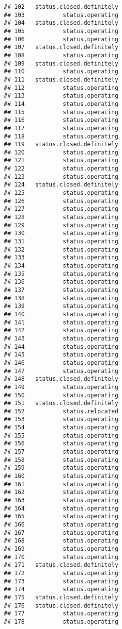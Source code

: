 \documentclass[
]{article}
\begin{document}
\begin{verbatim}
## 102   status.closed.definitely
## 103           status.operating
## 104   status.closed.definitely
## 105           status.operating
## 106           status.operating
## 107   status.closed.definitely
## 108           status.operating
## 109   status.closed.definitely
## 110           status.operating
## 111   status.closed.definitely
## 112           status.operating
## 113           status.operating
## 114           status.operating
## 115           status.operating
## 116           status.operating
## 117           status.operating
## 118           status.operating
## 119   status.closed.definitely
## 120           status.operating
## 121           status.operating
## 122           status.operating
## 123           status.operating
## 124   status.closed.definitely
## 125           status.operating
## 126           status.operating
## 127           status.operating
## 128           status.operating
## 129           status.operating
## 130           status.operating
## 131           status.operating
## 132           status.operating
## 133           status.operating
## 134           status.operating
## 135           status.operating
## 136           status.operating
## 137           status.operating
## 138           status.operating
## 139           status.operating
## 140           status.operating
## 141           status.operating
## 142           status.operating
## 143           status.operating
## 144           status.operating
## 145           status.operating
## 146           status.operating
## 147           status.operating
## 148   status.closed.definitely
## 149           status.operating
## 150           status.operating
## 151   status.closed.definitely
## 152           status.relocated
## 153           status.operating
## 154           status.operating
## 155           status.operating
## 156           status.operating
## 157           status.operating
## 158           status.operating
## 159           status.operating
## 160           status.operating
## 161           status.operating
## 162           status.operating
## 163           status.operating
## 164           status.operating
## 165           status.operating
## 166           status.operating
## 167           status.operating
## 168           status.operating
## 169           status.operating
## 170           status.operating
## 171   status.closed.definitely
## 172           status.operating
## 173           status.operating
## 174           status.operating
## 175   status.closed.definitely
## 176   status.closed.definitely
## 177           status.operating
## 178           status.operating

\end{verbatim}
\end{document}
